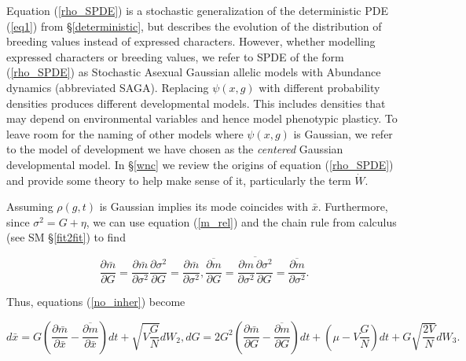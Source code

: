 \documentclass[]{elsarticle} %
\begin{document}
Equation (\ref{rho_SPDE}) is a stochastic generalization of the
deterministic PDE (\ref{eq1}) from \S\ref{deterministic}, but describes
the evolution of the distribution of breeding values instead of
expressed characters. However, whether modelling expressed characters or
breeding values, we refer to SPDE of the form (\ref{rho_SPDE}) as
Stochastic Asexual Gaussian allelic models with Abundance dynamics
(abbreviated SAGA). Replacing \(\psi(x,g)\) with different probability
densities produces different developmental models. This includes
densities that may depend on environmental variables and hence model
phenotypic plasticy. To leave room for the naming of other models where
\(\psi(x,g)\) is Gaussian, we refer to the model of development we have
chosen as the \emph{centered} Gaussian developmental model. In
\S\ref{wnc} we review the origins of equation (\ref{rho_SPDE}) and
provide some theory to help make sense of it, particularly the term
\(\dot W\).

Assuming \(\rho(g,t)\) is Gaussian implies its mode coincides with
\(\bar x\). Furthermore, since \(\sigma^2=G+\eta\), we can use equation
(\ref{m_rel}) and the chain rule from calculus (see SM \S\ref{fit2fit})
to find

\begin{subequations}
\begin{equation}
\frac{\partial\bar m}{\partial G}=\frac{\partial\bar m}{\partial\sigma^2}\frac{\partial\sigma^2}{\partial G}=\frac{\partial\bar m}{\partial\sigma^2},
\end{equation}
\begin{equation}
\overline{\frac{\partial m}{\partial G}}=\overline{\frac{\partial m}{\partial\sigma^2}\frac{\partial\sigma^2}{\partial G}}=\overline{\frac{\partial m}{\partial\sigma^2}}.
\end{equation}
\end{subequations}

Thus, equations (\ref{no_inher}) become

\begin{subequations}\label{inher}
\begin{equation}\label{xbarfinal}
d\bar x=G\left(\frac{\partial\bar m}{\partial\bar x}-\overline{\frac{\partial m}{\partial\bar x}}\right)dt+\sqrt{V\frac{G}{N}}dW_2,
\end{equation}
\begin{equation}\label{Gfinal}
dG=2G^2\left(\frac{\partial\bar m}{\partial G}-\overline{\frac{\partial m}{\partial G}}\right)dt+\left(\mu-V\frac{G}{N}\right)dt+ G\sqrt{\frac{2V}{N}}dW_3.
\end{equation}
\end{subequations}
\end{document}

